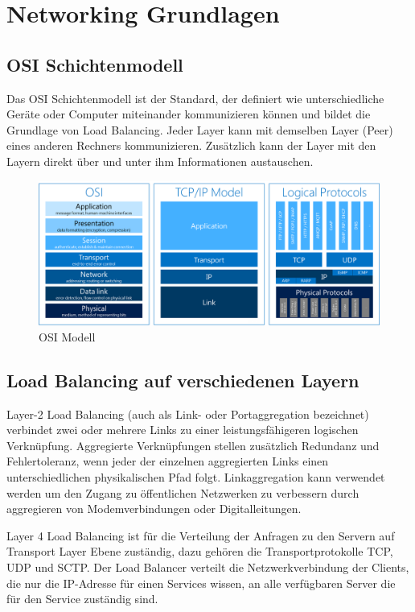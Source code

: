 \section{Networking Grundlagen}
\label{sec:Networking Grundlagen}

\subsection{OSI Schichtenmodell}
\label{sec:OSI Schichtenmodell}
Das OSI Schichtenmodell ist der Standard, der definiert wie unterschiedliche Geräte oder Computer miteinander kommunizieren können und bildet die Grundlage von Load Balancing. Jeder Layer kann mit demselben Layer (Peer) eines anderen Rechners kommunizieren. Zusätzlich kann der Layer mit den Layern direkt über und unter ihm Informationen austauschen. \cite{LoadBalancing2}

\begin{figure}[!ht]
	\begin{center}
		\includegraphics[width=0.8\linewidth]{images/loadbalancing3.jpg}
		\caption{OSI Modell \cite{LoadBalancingGrafik2}}
		\label{OSI Modell}
	\end{center}
\end{figure}

\subsection{Load Balancing auf verschiedenen Layern}
\label{sec:Load Balancing auf verschiedenen Layern}
Layer-2 Load Balancing (auch als Link- oder Portaggregation bezeichnet) verbindet zwei oder mehrere Links zu einer leistungsfähigeren logischen Verknüpfung. Aggregierte Verknüpfungen stellen zusätzlich Redundanz und Fehlertoleranz, wenn jeder der einzelnen aggregierten Links einen unterschiedlichen physikalischen Pfad folgt. Linkaggregation kann verwendet werden um den Zugang zu öffentlichen Netzwerken zu verbessern durch aggregieren von Modemverbindungen oder Digitalleitungen. 

Layer 4 Load Balancing ist für die Verteilung der Anfragen zu den Servern auf Transport Layer Ebene zuständig, dazu gehören die Transportprotokolle TCP, UDP und SCTP. Der Load Balancer verteilt die Netzwerkverbindung der Clients, die nur die IP-Adresse für einen Services wissen, an alle verfügbaren Server die für den Service zuständig sind.  

